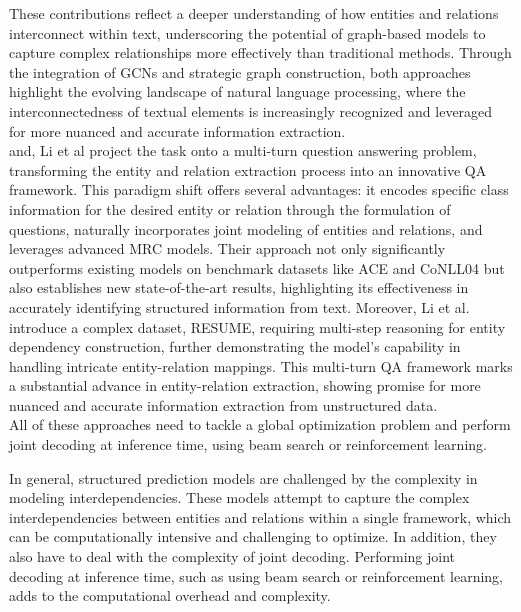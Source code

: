 These contributions reflect a deeper understanding of how entities and relations interconnect within text, underscoring the potential of graph-based models to capture complex relationships more effectively than traditional methods. Through the integration of GCNs and strategic graph construction, both approaches highlight the evolving landscape of natural language processing, where the interconnectedness of textual elements is increasingly recognized and leveraged for more nuanced and accurate information extraction.\\

and, Li et al\cite{li-etal-2019-entity} project the task onto a multi-turn question answering problem, transforming the entity and relation extraction process into an innovative QA framework. This paradigm shift offers several advantages: it encodes specific class information for the desired entity or relation through the formulation of questions, naturally incorporates joint modeling of entities and relations, and leverages advanced \ac{MRC} models. Their approach not only significantly outperforms existing models on benchmark datasets like ACE and CoNLL04 but also establishes new state-of-the-art results, highlighting its effectiveness in accurately identifying structured information from text. Moreover, Li et al. introduce a complex dataset, RESUME, requiring multi-step reasoning for entity dependency construction, further demonstrating the model's capability in handling intricate entity-relation mappings. This multi-turn QA framework marks a substantial advance in entity-relation extraction, showing promise for more nuanced and accurate information extraction from unstructured data.\\
All of these approaches need to tackle a global optimization problem and perform joint decoding at inference time, using beam search or reinforcement learning.

In general, structured prediction models are challenged by the complexity in modeling interdependencies. These models attempt to capture the complex interdependencies between entities and relations within a single framework, which can be computationally intensive and challenging to optimize. In addition, they also have to deal with the complexity of joint decoding. Performing joint decoding at inference time, such as using beam search or reinforcement learning, adds to the computational overhead and complexity.


